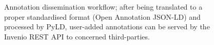 \begin{figure}[!ht]
  \centering
  \caption[Annotation dissemination workflow]
          {Annotation dissemination workflow; after being translated to a proper
           standardised format (Open Annotation JSON-LD) and processed by PyLD,
           user-added annotations can be served by the Invenio REST API to
           concerned third-parties.}
  \label{fig:restanno}
\end{figure}
